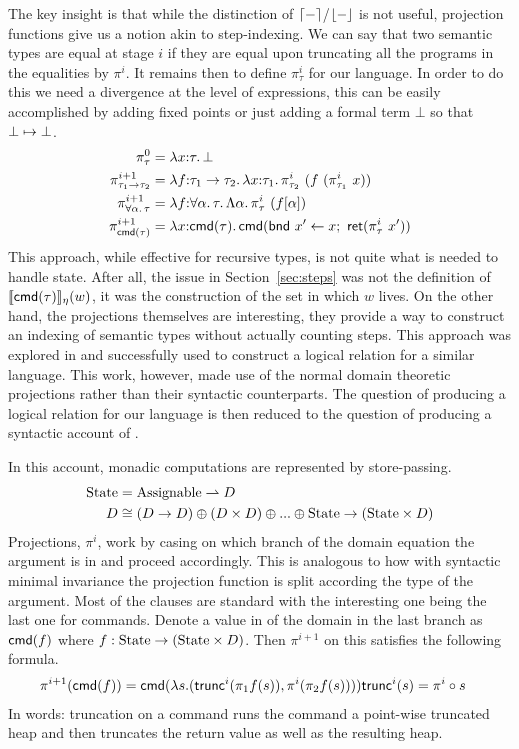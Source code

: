 The key insight is that while the distinction of
$\lceil - \rceil$/$\lfloor - \rfloor$ is not useful, projection functions
give us a notion akin to step-indexing. We can say that two semantic
types are equal at stage $i$ if they are equal upon truncating all the
programs in the equalities by $\pi^i$. It remains then to define
$\pi_\tau^i$ for our language. In order to do this we need a
divergence at the level of expressions, this can be easily
accomplished by adding fixed points or just adding a formal term
$\bot$ so that $\bot \mapsto \bot$.
\begin{align*}
  \pi_\tau^0 &= \lambda x {:} \tau.\, \bot\\
  \pi_{\tau_1 \to \tau_2}^{i + 1} &=
  \lambda f {:} \tau_1 \to \tau_2.\, \lambda x {:} \tau_1.\, \pi_{\tau_2}^i\ (f\ (\pi_{\tau_1}^i\ x))\\
  \pi_{\forall \alpha.\, \tau}^{i + 1} &=
  \lambda f {:} \forall \alpha.\, \tau.\, \Lambda \alpha.\, \pi_\tau^i\ (f[\alpha])\\
  \pi_{\mathsf{cmd}(\tau)}^{i + 1} &=
  \lambda x {:} \mathsf{cmd}(\tau).\, \mathsf{cmd}(\mathsf{bnd}\ x' \gets x;\ \mathsf{ret}(\pi_\tau^i\ x'))
\end{align*}
This approach, while effective for recursive types, is not quite what
is needed to handle state. After all, the issue in
Section~\ref{sec:steps} was not the definition of
$\llbracket \mathsf{cmd}(\tau) \rrbracket_\eta(w)$, it was the construction of the set in which
$w$ lives. On the other hand, the projections themselves are
interesting, they provide a way to construct an indexing of semantic
types without actually counting steps. This approach was explored in
\citet{Birkedal:domain:10} and successfully used to construct a
logical relation for a similar language. This work, however, made use
of the normal domain theoretic projections rather than their syntactic
counterparts. The question of producing a logical relation for our
language is then reduced to the question of producing a syntactic
account of \citet{Birkedal:domain:10}.

In this account, monadic computations are represented by
store-passing.
\begin{align*}
  \mathrm{State} &= \mathrm{Assignable} \rightharpoonup D\\
  D &\cong (D \to D) \oplus (D \times D) \oplus ... \oplus \mathrm{State} \to (\mathrm{State} \times D)
\end{align*}
Projections, $\pi^i$, work by casing on which branch of the domain
equation the argument is in and proceed accordingly. This is analogous
to how with syntactic minimal invariance the projection function is
split according the type of the argument. Most of the clauses are
standard with the interesting one being the last one for
commands. Denote a value in of the domain in the last branch as
$\mathsf{cmd}(f)$ where $f : \mathrm{State} \to (\mathrm{State} \times D)$. Then
$\pi^{i + 1}$ on this satisfies the following formula.
\begin{align*}
  \pi^{i + 1}(\mathsf{cmd}(f)) &=
  \mathsf{cmd}(\lambda s. (\mathsf{trunc}^i(\pi_1 f(s)), \pi^i(\pi_2 f(s))))
  \mathsf{trunc}^i(s) = \pi^i \circ s
\end{align*}
In words: truncation on a command runs the command a point-wise
truncated heap and then truncates the return value as well as the
resulting heap.

